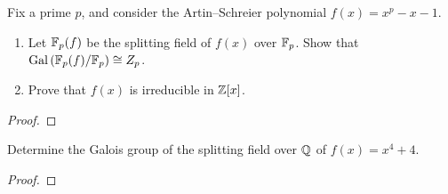 \begin{problem}
Fix a prime $p$, and consider the Artin--Schreier polynomial
$f(x)=x^p-x-1$.
\begin{enumerate}[noitemsep,label=(\alph*)]
\item Let $\mathbb{F}_p(f)$ be the splitting field of $f(x)$ over $\mathbb{F}_p$. Show
  that $\operatorname{Gal}\left(\mathbb{F}_p(f)/\mathbb{F}_p\right)\cong Z_p$.
\item Prove that $f(x)$ is irreducible in $\mathbb{Z}[x]$.
\end{enumerate}
\end{problem}
\begin{proof}
\end{proof}
\begin{problem}
Determine the Galois group of the splitting field over $\mathbb{Q}$ of
$f(x)=x^4+4$.
\end{problem}
\begin{proof}
\end{proof}


